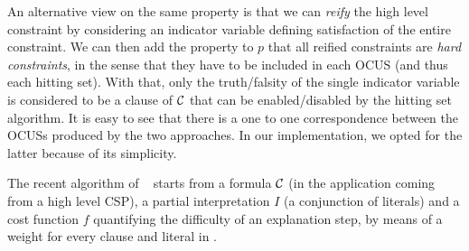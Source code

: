 {An alternative view on the same property is that we can \emph{reify} the high level constraint by considering an indicator variable defining satisfaction of the entire constraint. 
We can then add the property to $p$ that all reified constraints are \emph{hard constraints}, in the sense that they have to be included in each OCUS (and thus each hitting set). With that, only the truth/falsity of the single indicator variable is considered to be a clause of $\mathcal{C} $ that can be enabled/disabled by the hitting set algorithm. 
It is easy to see that there is a one to one correspondence between the OCUSs produced by the two approaches. In our implementation, we opted for the latter because of its simplicity. 
}

The recent algorithm of ~\citet{ecai/BogaertsGCG20} starts from a formula $\mathcal{C} $ (in the application coming from a high level CSP), a partial interpretation $I$ (a conjunction of literals) and a cost function $f$ quantifying the difficulty of an explanation step, by means of a weight for every clause and literal in \formula. %

